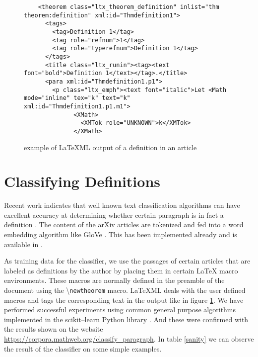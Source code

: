 \documentclass[a4paper]{easychair}
\begin{document}
\begin{center}
\begin{figure}[h]
\begin{lstlisting}
    <theorem class="ltx_theorem_definition" inlist="thm theorem:definition" xml:id="Thmdefinition1">
      <tags>
        <tag>Definition 1</tag>
        <tag role="refnum">1</tag>
        <tag role="typerefnum">Definition 1</tag>
      </tags>
      <title class="ltx_runin"><tag><text font="bold">Definition 1</text></tag>.</title>
      <para xml:id="Thmdefinition1.p1">
        <p class="ltx_emph"><text font="italic">Let <Math mode="inline" tex="k" text="k" xml:id="Thmdefinition1.p1.m1">
              <XMath>
                <XMTok role="UNKNOWN">k</XMTok>
              </XMath>
\end{lstlisting}
    \caption{\label{xml1} example of LaTeXML output of a definition in an article}
\end{figure}
\end{center}


\section{Classifying Definitions}
Recent work indicates that well known text classification algorithms \cite{bengio2003neural,chen2017improving} can have excellent accuracy  at determining whether certain paragraph is in fact a definition \cite{webscipara}. The content of the arXiv articles are tokenized and fed into a word embedding algorithm like GloVe \cite{pennington2014glove}. This has been  implemented already and is available in \cite{SML}. 

As training data for the classifier, we use the passages of certain articles that are labeled as definitions by the author by placing them in certain \LaTeX{} macro environments. These macros are normally defined in the preamble of the document using the \textbackslash \texttt{newtheorem} macro. LaTeXML deals with the user defined macros and tags the corresponding text in the output like in figure \ref{xml1}. We have performed successful experiments  using common general purpose algorithms implemented in the scikit--learn Python library \cite{scikit-learn}. And these were confirmed with the results shown on the website \url{https://corpora.mathweb.org/classify_paragraph}.
In table \ref{sanity} we can observe the result of the classifier on some simple examples.
\end{document}
